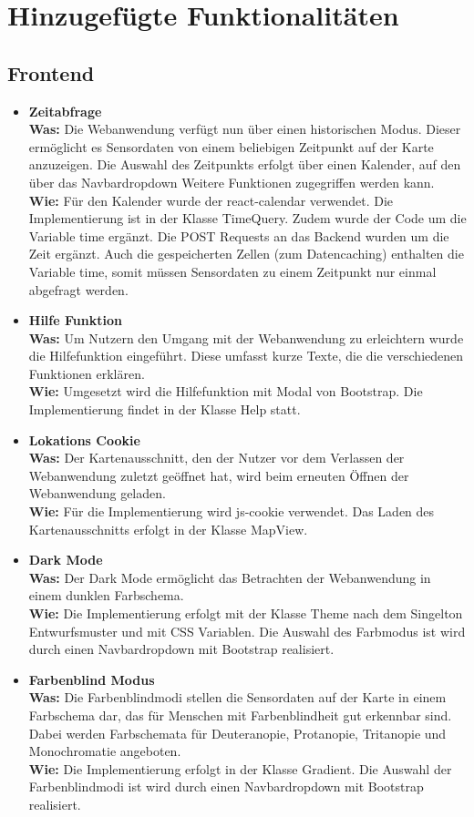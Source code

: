 \section{Hinzugefügte Funktionalitäten}

\subsection{Frontend}
\begin{itemize}
	\item \textbf{Zeitabfrage}
	\\
	\textbf{Was:} Die Webanwendung verfügt nun über einen historischen Modus. Dieser ermöglicht es Sensordaten von einem beliebigen Zeitpunkt auf der Karte anzuzeigen. Die Auswahl des Zeitpunkts erfolgt über einen Kalender, auf den über das Navbardropdown Weitere Funktionen zugegriffen werden kann.
	\\ 
	\textbf{Wie:} Für den Kalender wurde der react-calendar verwendet. Die Implementierung ist in der Klasse TimeQuery. Zudem wurde der Code um die Variable time ergänzt. Die POST Requests an das Backend wurden um die Zeit ergänzt. Auch die gespeicherten Zellen (zum Datencaching) enthalten die Variable time, somit müssen Sensordaten zu einem Zeitpunkt nur einmal abgefragt werden.
	\item \textbf{Hilfe Funktion}
	\\
	\textbf{Was:} Um Nutzern den Umgang mit der Webanwendung zu erleichtern wurde die Hilfefunktion eingeführt. Diese umfasst kurze Texte, die die verschiedenen Funktionen erklären. 
	\\
	\textbf{Wie:} Umgesetzt wird die Hilfefunktion mit Modal von \gls{Bootstrap}. Die Implementierung findet in der Klasse Help statt.
	\item \textbf{Lokations Cookie}
	\\
	\textbf{Was:} Der Kartenausschnitt, den der Nutzer vor dem Verlassen der Webanwendung zuletzt geöffnet hat, wird beim erneuten Öffnen der Webanwendung geladen.
	\\
	\textbf{Wie:} Für die Implementierung wird js-cookie verwendet. Das Laden des Kartenausschnitts erfolgt in der Klasse MapView.
	\item \textbf{Dark Mode}
	\\
	\textbf{Was:} Der Dark Mode ermöglicht das Betrachten der Webanwendung in einem dunklen Farbschema.
	\\
	\textbf{Wie:} Die Implementierung erfolgt mit der Klasse Theme nach dem Singelton Entwurfsmuster und mit CSS Variablen. Die Auswahl des Farbmodus ist wird durch einen Navbardropdown mit \gls{Bootstrap} realisiert.
	\item \textbf{Farbenblind Modus} 
	\\
	\textbf{Was:} Die Farbenblindmodi stellen die Sensordaten auf der Karte in einem Farbschema dar, das für Menschen mit Farbenblindheit gut erkennbar sind. Dabei werden Farbschemata für Deuteranopie, Protanopie, Tritanopie und Monochromatie angeboten.
	\\
	\textbf{Wie:} Die Implementierung erfolgt in der Klasse Gradient. Die Auswahl der Farbenblindmodi ist wird durch einen Navbardropdown mit \gls{Bootstrap} realisiert.
\end{itemize}
